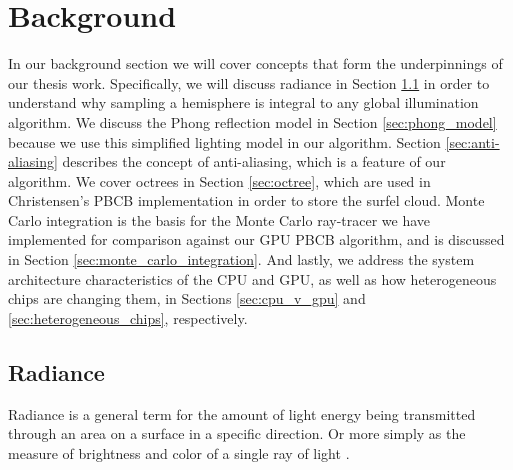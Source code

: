 \chapter{Background}
\label{ch:background}

 In our background section we will cover concepts that form the underpinnings of our thesis work. Specifically, we will discuss radiance in Section \ref{sec:radiance} in order to understand why sampling a hemisphere is integral to any global illumination algorithm. We discuss the Phong reflection model in Section \ref{sec:phong_model} because we use this simplified lighting model in our algorithm. Section \ref{sec:anti-aliasing} describes the concept of anti-aliasing, which is a feature of our algorithm. We cover octrees in Section \ref{sec:octree}, which are used in Christensen's PBCB implementation \cite{bib:christensen2008} in order to store the surfel cloud. Monte Carlo integration is the basis for the Monte Carlo ray-tracer we have implemented for comparison against our GPU PBCB algorithm, and is discussed in Section \ref{sec:monte_carlo_integration}. And lastly, we address the system architecture characteristics of the CPU and GPU, as well as how heterogeneous chips are changing them, in Sections \ref{sec:cpu_v_gpu} and \ref{sec:heterogeneous_chips}, respectively.

\section{Radiance}
\label{sec:radiance}

Radiance is a general term for the amount of light energy being transmitted through an area on a surface in a specific direction. Or more simply as the measure of brightness and color of a single ray of light \cite{bib:rtr}.

